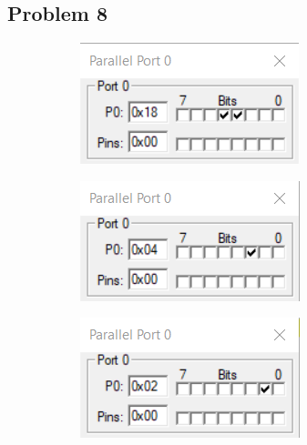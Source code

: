 \documentclass{lab_sheet}
\begin{document}
\subsection*{Problem 8}
\begin{figure}[H]
\begin{subfigure}{.5\textwidth}
  \centering
  \includegraphics[frame,width=.8\linewidth]{../Figures/1_8_a.png}   
  \caption{}
  \label{fig:prob8-a}
\end{subfigure}
\begin{subfigure}{.5\textwidth}
  \centering
  \includegraphics[frame,width=.8\linewidth]{../Figures/1_8_b.png}   
  \caption{}
  \label{fig:prob8-b}
\end{subfigure}
\begin{subfigure}{.5\textwidth}
  \centering
  \includegraphics[frame,width=.8\linewidth]{../Figures/1_8_c.png}   

\end{subfigure}
\end{figure}
\end{document}
